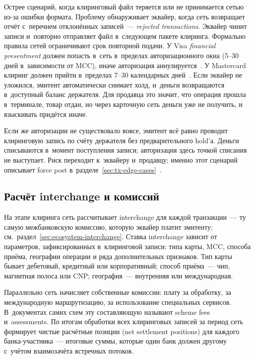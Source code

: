 Острее сценарий, когда клиринговый файл теряется или не принимается
сетью из-за ошибки формата. Проблему обнаруживает эквайер, когда сеть
возвращает отчёт с~перечнем отклонённых записей~--- \textit{rejected
transactions}. Эквайер чинит записи и~повторно отправляет файл
в~следующем пакете клиринга. Формально правила сетей ограничивают срок
повторной подачи. У Visa \textit{financial presentment} должен попасть в~сеть
в~пределах авторизационного окна (5--30 дней в~зависимости от MCC),
иначе авторизация аннулируется~\cite{visa-core-rules}. У Mastercard
клиринг должен прийти в~пределах 7--30 календарных дней~\cite{mc-tpr}.
Если эквайер не уложился, эмитент автоматически снимает холд,
и~деньги возвращаются в~доступный баланс держателя. Для продавца
это значит, что операция прошла в~терминале, товар отдан, но через
карточную сеть деньги уже не получить, и взыскивать придётся
иначе.

Если же авторизации не существовало вовсе, эмитент всё равно
проводит клиринговую запись по счёту держателя без предварительного
hold'а. Деньги списываются в~момент поступления записи; авторизация
здесь точкой списания не выступает. Риск переходит к~эквайеру и~продавцу; именно этот
сценарий описывает force post в~разделе~\ref{sec:tx-edge-cases}~\cite{mc-tpr}.

\subsection*{Расчёт interchange и комиссий}

На этапе клиринга сеть рассчитывает interchange для каждой
транзакции~--- ту самую межбанковскую комиссию, которую эквайер
платит эмитенту; см.\ раздел~\ref{sec:ecosystem-interchange}. Ставка interchange
зависит от параметров, зафиксированных в~клиринговой записи:
типа карты, MCC, способа приёма, географии операции и ряда
дополнительных признаков. Тип карты бывает дебетовый, кредитный
или корпоративный; способ приёма~--- чип, магнитная полоса
или CNP; география~--- внутренняя или международная.

Параллельно сеть начисляет собственные комиссии: плату за обработку,
за международную маршрутизацию, за использование специальных
сервисов. В~документах самих схем эту составляющую называют scheme fees
и~assessments. По итогам обработки всех клиринговых записей за период
сеть формирует чистые расчётные позиции (net settlement positions)
для каждого банка-участника~--- итоговые суммы, которые один банк
должен другому с~учётом взаимозачёта встречных потоков.

